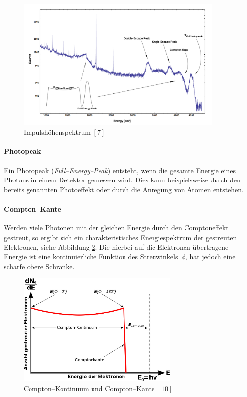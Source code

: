 \documentclass[12pt,a4paper]{scrartcl}
\numberwithin{equation}{section} %
\begin{document}
\begin{figure}[h]
	\centering
	\includegraphics[width=0.9\textwidth]{../media/B3.4/Am_Be_SourceSpectrum.jpg}
	\caption{Impulshöhenspektrum $[7]$}
	\label{abb:Impulshoehenspektrum}
\end{figure}

\paragraph{Photopeak}

Ein Photopeak (\emph{Full--Energy--Peak}) entsteht, wenn die gesamte Energie eines Photons in einem Detektor gemessen wird. Dies kann beispielsweise durch den bereits genannten Photoeffekt oder durch die Anregung von Atomen entstehen.

\paragraph{Compton--Kante}

Werden viele Photonen mit der gleichen Energie durch den Comptoneffekt gestreut, so ergibt sich ein charakteristisches Energiespektrum der gestreuten Elektronen, siehe Abbildung \ref{abb:Compton-Kante}. Die hierbei auf die Elektronen übertragene Energie ist eine kontinuierliche Funktion des Streuwinkels~$\phi$, hat jedoch eine scharfe obere Schranke.

\begin{figure}[h]
	\centering
	\includegraphics[width=0.7\textwidth]{../media/B3.4/Comptonspektrum.jpg}
	\caption{Compton--Kontinuum und Compton--Kante $[10]$}
	\label{abb:Compton-Kante}
\end{figure}
\end{document}
